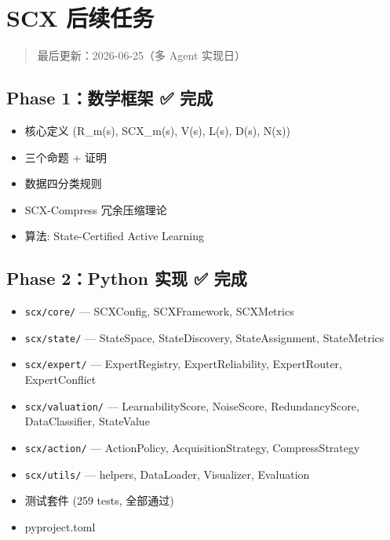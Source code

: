 \documentclass[
  12pt,
]{ctexart}
\author{SCX}
\date{2026}
\providecommand{\tightlist}{%
  \setlength{\itemsep}{0pt}\setlength{\parskip}{0pt}}
\begin{document}
\section{SCX 后续任务}\label{scx-ux540eux7eedux4efbux52a1}

\begin{quote}
最后更新：2026-06-25（多 Agent 实现日）
\end{quote}

\subsection{Phase 1：数学框架 ✅
完成}\label{phase-1ux6570ux5b66ux6846ux67b6-ux5b8cux6210}

\begin{itemize}
\tightlist
\item[$\boxtimes$]
  核心定义 (R\_m(s), SCX\_m(s), V(s), L(s), D(s), N(x))
\item[$\boxtimes$]
  三个命题 + 证明
\item[$\boxtimes$]
  数据四分类规则
\item[$\boxtimes$]
  SCX-Compress 冗余压缩理论
\item[$\boxtimes$]
  算法: State-Certified Active Learning
\end{itemize}

\subsection{Phase 2：Python 实现 ✅
完成}\label{phase-2python-ux5b9eux73b0-ux5b8cux6210}

\begin{itemize}
\tightlist
\item[$\boxtimes$]
  \texttt{scx/core/} --- SCXConfig, SCXFramework, SCXMetrics
\item[$\boxtimes$]
  \texttt{scx/state/} --- StateSpace, StateDiscovery, StateAssignment,
  StateMetrics
\item[$\boxtimes$]
  \texttt{scx/expert/} --- ExpertRegistry, ExpertReliability,
  ExpertRouter, ExpertConflict
\item[$\boxtimes$]
  \texttt{scx/valuation/} --- LearnabilityScore, NoiseScore,
  RedundancyScore, DataClassifier, StateValue
\item[$\boxtimes$]
  \texttt{scx/action/} --- ActionPolicy, AcquisitionStrategy,
  CompressStrategy
\item[$\boxtimes$]
  \texttt{scx/utils/} --- helpers, DataLoader, Visualizer, Evaluation
\item[$\boxtimes$]
  测试套件 (259 tests, 全部通过)
\item[$\boxtimes$]
  pyproject.toml
\end{itemize}
\end{document}
